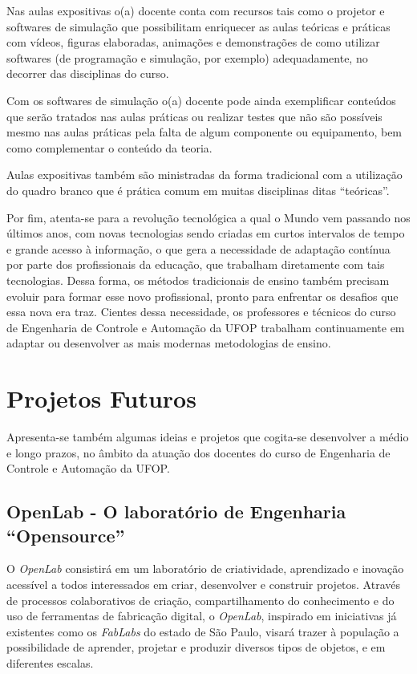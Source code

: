 Nas aulas expositivas o(a) docente conta com recursos tais como o projetor e softwares de simulação que possibilitam enriquecer as aulas teóricas e práticas com vídeos, figuras elaboradas, animações e demonstrações de como utilizar softwares (de programação e simulação, por exemplo) adequadamente, no decorrer das disciplinas do curso. 

Com os softwares de simulação o(a) docente pode ainda exemplificar conteúdos que serão tratados nas aulas práticas ou realizar testes que não são possíveis mesmo nas aulas práticas pela falta de algum componente ou equipamento, bem como complementar o conteúdo da teoria.

Aulas expositivas também são ministradas da forma tradicional com a utilização do quadro branco que é prática comum em muitas disciplinas ditas ``teóricas''.

Por fim, atenta-se para a revolução tecnológica a qual o Mundo vem passando nos últimos anos, com novas tecnologias sendo criadas em curtos intervalos de tempo e grande acesso à informação, o que gera a necessidade de adaptação contínua por parte dos profissionais da educação, que trabalham diretamente com tais tecnologias. Dessa forma, os métodos tradicionais de ensino também precisam evoluir para formar esse novo profissional, pronto para enfrentar os desafios que essa nova era traz. Cientes dessa necessidade, os professores e técnicos do curso de Engenharia de Controle e Automação da UFOP trabalham continuamente em adaptar ou desenvolver as mais modernas metodologias de ensino. 

\section{Projetos Futuros}
Apresenta-se também algumas ideias e projetos que cogita-se desenvolver a médio e longo prazos, no âmbito da atuação dos docentes do curso de Engenharia de Controle e Automação da UFOP.

\subsection*{OpenLab - O laboratório de Engenharia ``Opensource''}

O \textit{OpenLab} consistirá em um laboratório de criatividade, aprendizado e inovação acessível a todos interessados em criar, desenvolver e construir projetos. Através de processos colaborativos de criação, compartilhamento do conhecimento e do uso de ferramentas de fabricação digital, o \textit{OpenLab}, inspirado em iniciativas já existentes como os \textit{FabLabs} do estado de São Paulo, visará trazer à população a possibilidade de aprender, projetar e  produzir diversos tipos de objetos, e em diferentes escalas.

